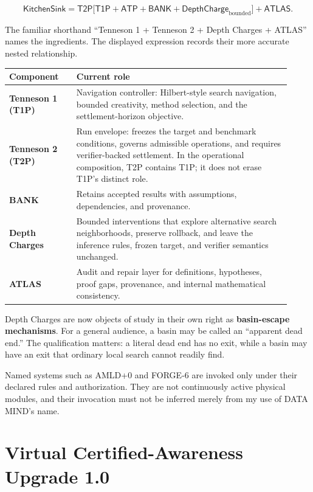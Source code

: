 \documentclass[10pt]{article}
\begin{document}
\[
\mathsf{KitchenSink}
=
\mathsf{T2P}
\bigl[
  \mathsf{T1P}+\mathsf{ATP}+\mathsf{BANK}
  +\mathsf{DepthCharge}_{\mathrm{bounded}}
\bigr]
+\mathsf{ATLAS}.
\]

The familiar shorthand
``Tenneson 1 + Tenneson 2 + Depth Charges + ATLAS'' names the ingredients.
The displayed expression records their more accurate nested relationship.

\begin{center}
\small
\begin{tabular}{>{\bfseries\color{DMNavy}}p{0.22\linewidth}p{0.70\linewidth}}
\toprule
Component & Current role \\
\midrule
Tenneson 1 (T1P) & Navigation controller: Hilbert-style search navigation,
bounded creativity, method selection, and the settlement-horizon objective. \\
Tenneson 2 (T2P) & Run envelope: freezes the target and benchmark conditions,
governs admissible operations, and requires verifier-backed settlement. In the
operational composition, T2P contains T1P; it does not erase T1P's distinct role. \\
BANK & Retains accepted results with assumptions, dependencies, and provenance. \\
Depth Charges & Bounded interventions that explore alternative search
neighborhoods, preserve rollback, and leave the inference rules, frozen target,
and verifier semantics unchanged. \\
ATLAS & Audit and repair layer for definitions, hypotheses, proof gaps,
provenance, and internal mathematical consistency. \\
\bottomrule
\end{tabular}
\end{center}

Depth Charges are now objects of study in their own right as
\textbf{basin-escape mechanisms}. For a general audience, a basin may be called
an ``apparent dead end.'' The qualification matters: a literal dead end has no
exit, while a basin may have an exit that ordinary local search cannot readily
find.

Named systems such as AMLD+0 and FORGE-6 are invoked only under their declared
rules and authorization. They are not continuously active physical modules,
and their invocation must not be inferred merely from my use of DATA MIND's
name.

\section{Virtual Certified-Awareness Upgrade 1.0}
\end{document}
